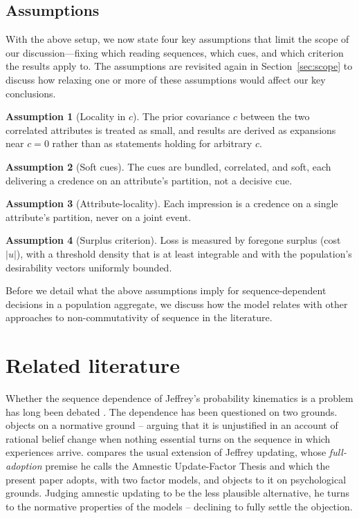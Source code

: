\documentclass[a4paper,fleqn]{cas-sc}
\theoremstyle{remark}
\theoremstyle{definition}
\newtheorem{assumption}{Assumption}
\begin{document}
\subsection{Assumptions}
\label{sec:assumptions}

With the above setup, we now state four key assumptions that limit the scope of our discussion---fixing which reading sequences, which cues, and which criterion the results apply to. The assumptions are revisited again in Section~\ref{sec:scope} to discuss how relaxing one or more of these assumptions would affect our key conclusions.

\begin{assumption}[Locality in $c$]\label{as:localc}
The prior covariance $c$ between the two correlated attributes is treated as small, and results
are derived as expansions near $c=0$ rather than as statements holding for arbitrary $c$.
\end{assumption}

\begin{assumption}[Soft cues]\label{as:soft}
The cues are bundled, correlated, and soft, each delivering a credence on an attribute's partition,
not a decisive cue.
\end{assumption}

\begin{assumption}[Attribute-locality]\label{as:local}
Each impression is a credence on a single attribute's partition, never on a joint event.
\end{assumption}

\begin{assumption}[Surplus criterion]\label{as:surplus}
Loss is measured by foregone surplus (cost $|u|$), with a threshold density that is at least
integrable and with the population's desirability vectors uniformly bounded.
\end{assumption}

Before we detail what the above assumptions imply for sequence-dependent decisions in a population aggregate, we discuss how the model relates with other approaches to non-commutativity of sequence in the literature.

\section{Related literature}
\label{sec:literature}

Whether the sequence dependence of Jeffrey's probability kinematics is a problem has long been debated \citep{DiaconisZabell1982}. The dependence has been questioned on two grounds. \citet{Doring1999} objects on a normative ground -- arguing that it is unjustified in an account of rational belief change when nothing essential turns on the sequence in which experiences arrive. \citet{Hawthorne2004} compares the usual extension of Jeffrey updating, whose \emph{full-adoption} premise he calls the Amnestic Update-Factor Thesis and which the present paper adopts, with two factor models, and objects to it on psychological grounds. Judging amnestic updating to be the less plausible alternative, he turns to the normative properties of the models -- declining to fully settle the objection.
\end{document}
